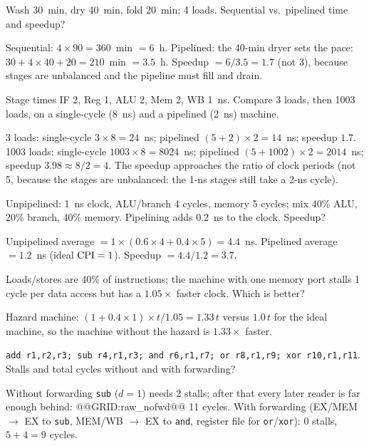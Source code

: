 \documentclass[11pt]{article}
\begin{document}
\begin{exercise}[Laundry]
Wash 30~min, dry 40~min, fold 20~min; 4 loads. Sequential vs.\ pipelined
time and speedup?
\end{exercise}
\begin{solution}
Sequential: $4\times90 = 360$~min $=6$~h. Pipelined: the 40-min dryer sets
the pace: $30 + 4\times40 + 20 = 210$~min $=3.5$~h. Speedup $=6/3.5 =
1.7$ (not 3), because stages are unbalanced and the pipeline must fill and
drain.
\end{solution}

\begin{exercise}
Stage times IF 2, Reg 1, ALU 2, Mem 2, WB 1~ns. Compare 3 loads, then 1003
loads, on a single-cycle (8~ns) and a pipelined (2~ns) machine.
\end{exercise}
\begin{solution}
3 loads: single-cycle $3\times8 = 24$~ns; pipelined $(5+2)\times2 = 14$~ns;
speedup $1.7$.
1003 loads: single-cycle $1003\times8 = 8024$~ns; pipelined
$(5+1002)\times2 = 2014$~ns; speedup $3.98 \approx 8/2 = 4$. The speedup
approaches the ratio of clock periods (not 5, because the stages are
unbalanced: the 1-ns stages still take a 2-ns cycle).
\end{solution}

\begin{exercise}
Unpipelined: 1~ns clock, ALU/branch 4 cycles, memory 5 cycles; mix 40\%
ALU, 20\% branch, 40\% memory. Pipelining adds 0.2~ns to the clock.
Speedup?
\end{exercise}
\begin{solution}
Unpipelined average $=1\times(0.6\times4 + 0.4\times5) = 4.4$~ns.
Pipelined average $= 1.2$~ns (ideal $\mathrm{CPI}=1$). Speedup $=4.4/1.2 = 3.7$.
\end{solution}

\begin{exercise}
Loads/stores are 40\% of instructions; the machine with one memory port
stalls 1 cycle per data access but has a $1.05\times$ faster clock. Which is
better?
\end{exercise}
\begin{solution}
Hazard machine: $(1+0.4\times1)\times t/1.05 = 1.33\,t$ versus $1.0\,t$ for
the ideal machine, so the machine without the hazard is $1.33\times$
faster.
\end{solution}

\begin{exercise}
\texttt{add r1,r2,r3; sub r4,r1,r3; and r6,r1,r7; or r8,r1,r9;
xor r10,r1,r11}. Stalls and total cycles without and with forwarding?
\end{exercise}
\begin{solution}
Without forwarding \texttt{sub} ($d=1$) needs 2 stalls; after that every
later reader is far enough behind:
@@GRID:raw_nofwd@@
11 cycles. With forwarding (EX/MEM $\to$ EX to \texttt{sub}, MEM/WB $\to$ EX
to \texttt{and}, register file for \texttt{or}/\texttt{xor}): 0 stalls,
$5+4 = 9$ cycles.
\end{solution}
\end{document}
